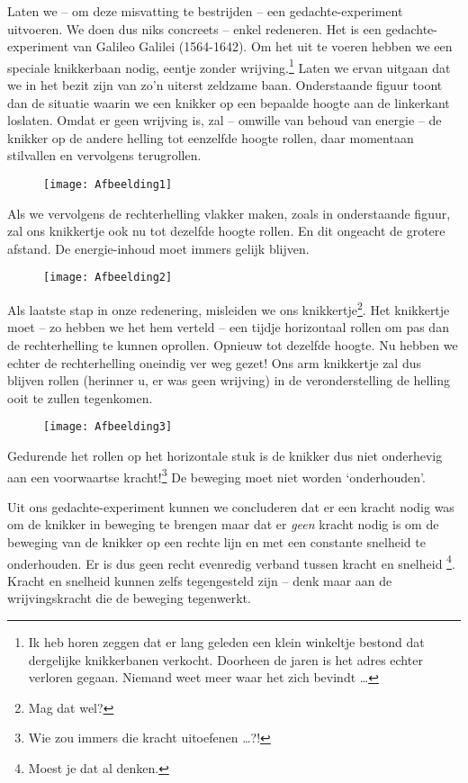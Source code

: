 Laten we -- om deze misvatting te bestrijden -- een gedachte-experiment uitvoeren. We doen dus niks concreets -- enkel redeneren. Het is een gedachte-experiment van Galileo Galilei (1564-1642). Om het uit te voeren hebben we een speciale knikkerbaan nodig, eentje zonder wrijving.\footnote{Ik heb horen zeggen dat er lang geleden een klein winkeltje bestond dat dergelijke knikkerbanen verkocht. Doorheen de jaren is het adres echter verloren gegaan. Niemand weet meer waar het zich bevindt \ldots} Laten we ervan uitgaan dat we in het bezit zijn van zo'n uiterst zeldzame baan. Onderstaande figuur toont dan de situatie waarin we een knikker op een bepaalde hoogte aan de linkerkant loslaten. Omdat er geen wrijving is, zal -- omwille van behoud van energie -- de knikker op de andere helling tot eenzelfde hoogte rollen, daar momentaan stilvallen en vervolgens terugrollen.
\begin{figure}[h]
\centering
\texttt{[image: Afbeelding1]}
\label{Afbeelding1}
\end{figure}

Als we vervolgens de rechterhelling vlakker maken, zoals in onderstaande figuur, zal ons knikkertje ook nu tot dezelfde hoogte rollen. En dit ongeacht de grotere afstand. De energie-inhoud moet immers gelijk blijven.
\begin{figure}[h]
\centering
\texttt{[image: Afbeelding2]}
\end{figure}

Als laatste stap in onze redenering, misleiden we ons knikkertje\footnote{Mag dat wel?}. Het knikkertje moet -- zo hebben we het hem verteld -- een tijdje horizontaal rollen om pas dan de rechterhelling te kunnen oprollen. Opnieuw tot dezelfde hoogte. Nu hebben we echter de rechterhelling oneindig ver weg gezet! Ons arm knikkertje zal dus blijven rollen (herinner u, er was geen wrijving) in de veronderstelling de helling ooit te zullen tegenkomen. 
\begin{figure}[h]
\centering
\texttt{[image: Afbeelding3]}
\end{figure}
Gedurende het rollen op het horizontale stuk is de knikker dus niet onderhevig aan een voorwaartse kracht!\footnote{Wie zou immers die kracht uitoefenen \ldots?!} De beweging moet niet worden `onderhouden'. 

Uit ons gedachte-experiment kunnen we concluderen dat er een kracht nodig was om de knikker in beweging te brengen maar dat er \emph{geen} kracht nodig is om de beweging van de knikker op een rechte lijn en met een constante snelheid te onderhouden. Er is dus geen recht evenredig verband tussen kracht en snelheid \footnote{Moest je dat al denken.}. Kracht en snelheid kunnen zelfs tegengesteld zijn -- denk maar aan de wrijvingskracht die de beweging tegenwerkt.

